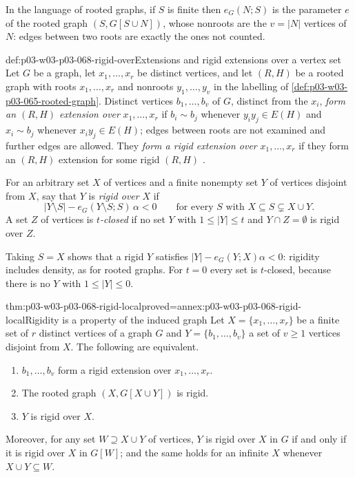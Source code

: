 In the language of rooted graphs, if \(S\) is finite then \(e_G(N;S)\) is
the parameter \(e\) of the rooted graph \((S,G[S\cup N])\), whose nonroots
are the \(v=|N|\) vertices of \(N\): edges between two roots are exactly the
ones not counted.

\begin{hbdefinition}{def:p03-w03-p03-068-rigid-over}{Extensions and rigid extensions over a vertex set}
Let \(G\) be a graph, let \(x_1,\ldots,x_r\) be distinct vertices, and let
\((R,H)\) be a rooted graph with roots \(x_1,\ldots,x_r\) and nonroots
\(y_1,\ldots,y_v\) in the labelling of
\cref{def:p03-w03-p03-065-rooted-graph}.  Distinct vertices
\(b_1,\ldots,b_v\) of \(G\), distinct from the \(x_i\), \emph{form an
\((R,H)\) extension over} \(x_1,\ldots,x_r\) if \(b_i\sim b_j\) whenever
\(y_iy_j\in E(H)\) and \(x_i\sim b_j\) whenever \(x_iy_j\in E(H)\); edges
between roots are not examined and further edges are allowed.  They
\emph{form a rigid extension over} \(x_1,\ldots,x_r\) if they form an
\((R,H)\) extension for some rigid \((R,H)\)
\cite[p.~8]{Spencer2007LogicRandomStructuresAuthor}.

For an arbitrary set \(X\) of vertices and a finite nonempty set \(Y\) of
vertices disjoint from \(X\), say that \(Y\) is \emph{rigid over} \(X\) if
\[
  |Y\setminus S|-e_G(Y\setminus S;S)\,\alpha<0
  \qquad\text{for every }S\text{ with }X\subseteq S\subsetneq X\cup Y.
\]
A set \(Z\) of vertices is \emph{\(t\)-closed} if no set \(Y\) with
\(1\leq|Y|\leq t\) and \(Y\cap Z=\emptyset\) is rigid over \(Z\).
\end{hbdefinition}

Taking \(S=X\) shows that a rigid \(Y\) satisfies
\(|Y|-e_G(Y;X)\alpha<0\): rigidity includes density, as for rooted graphs.
For \(t=0\) every set is \(t\)-closed, because there is no \(Y\) with
\(1\leq|Y|\leq0\).

\begin{hblemma}{thm:p03-w03-p03-068-rigid-local}{proved=annex:p03-w03-p03-068-rigid-local}{Rigidity is a property of the induced graph}
Let \(X=\{x_1,\ldots,x_r\}\) be a finite set of \(r\) distinct vertices of a
graph \(G\) and \(Y=\{b_1,\ldots,b_v\}\) a set of \(v\geq1\) vertices
disjoint from \(X\).  The following are equivalent.
\begin{enumerate}
\item \(b_1,\ldots,b_v\) form a rigid extension over \(x_1,\ldots,x_r\).
\item The rooted graph \((X,G[X\cup Y])\) is rigid.
\item \(Y\) is rigid over \(X\).
\end{enumerate}
Moreover, for any set \(W\supseteq X\cup Y\) of vertices, \(Y\) is rigid over
\(X\) in \(G\) if and only if it is rigid over \(X\) in \(G[W]\); and the same
holds for an infinite \(X\) whenever \(X\cup Y\subseteq W\).
\end{hblemma}

